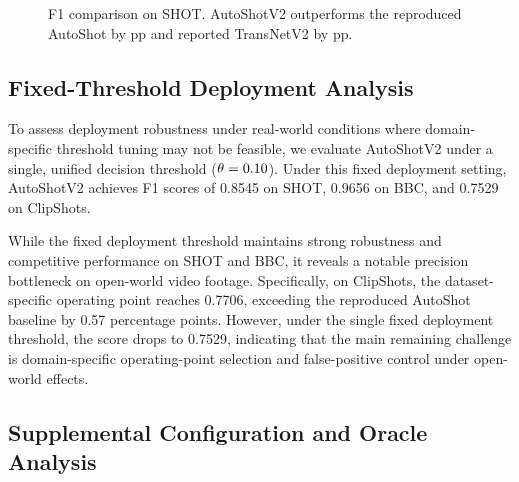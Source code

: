 \begin{figure}[!t]
\centering
{}
\caption{F1 comparison on SHOT. AutoShotV2 outperforms the reproduced
AutoShot by \PaperBestVsAutoShotPP{} pp and reported TransNetV2
by \PaperBestVsTransNetPP{} pp.}
\label{fig:bars}
\end{figure}

\subsection{Fixed-Threshold Deployment Analysis}
\label{subsec:fixed_deploy}

To assess deployment robustness under real-world conditions where domain-specific threshold tuning may not be feasible, we evaluate AutoShotV2 under a single, unified decision threshold ($\theta = 0.10$). Under this fixed deployment setting, AutoShotV2 achieves F1 scores of 0.8545 on SHOT, 0.9656 on BBC, and 0.7529 on ClipShots. 

While the fixed deployment threshold maintains strong robustness and competitive performance on SHOT and BBC, it reveals a notable precision bottleneck on open-world video footage. Specifically, on ClipShots, the dataset-specific operating point reaches 0.7706, exceeding the reproduced AutoShot baseline by 0.57 percentage points. However, under the single fixed deployment threshold, the score drops to 0.7529, indicating that the main remaining challenge is domain-specific operating-point selection and false-positive control under open-world effects.

\subsection{Supplemental Configuration and Oracle Analysis}
\label{sec:oracle_sweep}

